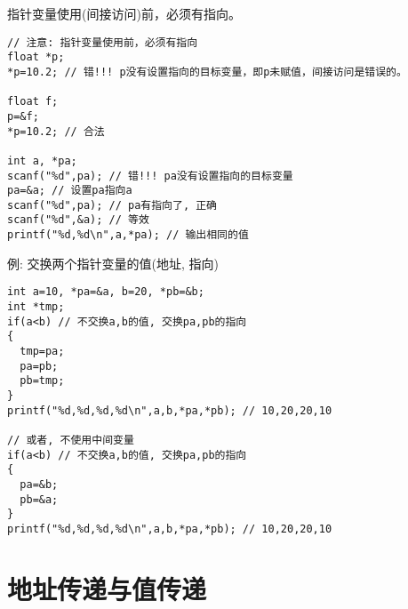 \begin{frame}{指针变量使用(间接访问)前，必须有指向。}
\vspace{-0.4cm}
\begin{lstlisting}
// 注意: 指针变量使用前，必须有指向
float *p;
*p=10.2; // 错!!! p没有设置指向的目标变量，即p未赋值，间接访问是错误的。

float f;
p=&f;
*p=10.2; // 合法

int a, *pa;
scanf("%d",pa); // 错!!! pa没有设置指向的目标变量
pa=&a; // 设置pa指向a
scanf("%d",pa); // pa有指向了, 正确
scanf("%d",&a); // 等效
printf("%d,%d\n",a,*pa); // 输出相同的值
\end{lstlisting}
\end{frame}

\begin{frame}{例: 交换两个指针变量的值(地址, 指向)}
\vspace{-0.4cm}
\begin{lstlisting}
int a=10, *pa=&a, b=20, *pb=&b;
int *tmp;
if(a<b) // 不交换a,b的值, 交换pa,pb的指向
{
  tmp=pa;
  pa=pb;
  pb=tmp;
}
printf("%d,%d,%d,%d\n",a,b,*pa,*pb); // 10,20,20,10

// 或者, 不使用中间变量
if(a<b) // 不交换a,b的值, 交换pa,pb的指向
{
  pa=&b;
  pb=&a;
}
printf("%d,%d,%d,%d\n",a,b,*pa,*pb); // 10,20,20,10
\end{lstlisting}
\end{frame}

\section{地址传递与值传递}

